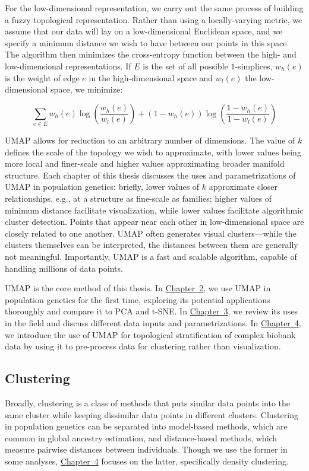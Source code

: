 For the low-dimensional representation, we carry out the same process of building a fuzzy topological representation. Rather than using a locally-varying metric, we assume that our data will lay on a low-dimensional Euclidean space, and we specify a minimum distance we wish to have between our points in this space. The algorithm then minimizes the cross-entropy function between the high- and low-dimensional representations. If $E$ is the set of all possible $1$-simplices, $w_{h}(e)$ is the weight of edge $e$ in the high-dimensional space and $w_{l}(e)$ the low-dimensional space, we minimize:

$$ \sum_{e \in E} w_{h}(e) \log{\left(\frac{w_{h}(e)}{w_{l}(e)}\right)} + (1 - w_{h}(e)) \log{\left(\frac{1 - w_{h}(e)}{1 - w_{l}(e)}\right)} $$

UMAP allows for reduction to an arbitrary number of dimensions. The value of $k$ defines the scale of the topology we wish to approximate, with lower values being more local and finer-scale and higher values approximating broader manifold structure. Each chapter of this thesis discusses the uses and parametrizations of UMAP in population genetics: briefly, lower values of $k$ approximate closer relationships, e.g., at a structure as fine-scale as families; higher values of minimum distance facilitate visualization, while lower values facilitate algorithmic cluster detection. Points that appear near each other in low-dimensional space are closely related to one another. UMAP often generates visual clusters---while the clusters themselves can be interpreted, the distances between them are generally not meaningful. Importantly, UMAP is a fast and scalable algorithm, capable of handling millions of data points.

UMAP is the core method of this thesis. In \hyperref[chap:chapter2]{Chapter~2}, we use UMAP in population genetics for the first time, exploring its potential applications thoroughly and compare it to PCA and t-SNE. In \hyperref[chap:chapter3]{Chapter~3}, we review its uses in the field and discuss different data inputs and parametrizations. In \hyperref[chap:chapter4]{Chapter~4}, we introduce the use of UMAP for topological stratification of complex biobank data by using it to pre-process data for clustering rather than visualization.

\subsection{Clustering}

Broadly, clustering is a class of methods that puts similar data points into the same cluster while keeping dissimilar data points in different clusters\citep{ben-david_clustering_2018}. Clustering in population genetics can be separated into model-based methods, which are common in global ancestry estimation, and distance-based methods, which measure pairwise distances between individuals. Though we use the former in some analyses, \hyperref[chap:chapter4]{Chapter~4} focuses on the latter, specifically density clustering.

